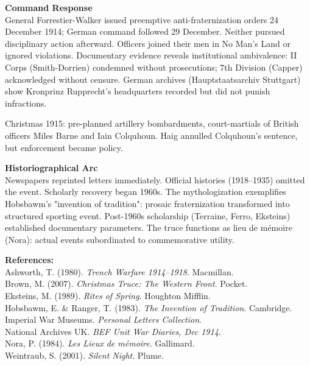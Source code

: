 \begin{technical}
\noindent\textbf{Command Response}\\[0.5em]
General Forrestier-Walker issued preemptive anti-fraternization orders 24 December 1914; German command followed 29 December. Neither pursued disciplinary action afterward. Officers joined their men in No Man's Land or ignored violations. Documentary evidence reveals institutional ambivalence: II Corps (Smith-Dorrien) condemned without prosecutions; 7th Division (Capper) acknowledged without censure. German archives (Hauptstaatsarchiv Stuttgart) show Kronprinz Rupprecht's headquarters recorded but did not punish infractions.

Christmas 1915: pre-planned artillery bombardments, court-martials of British officers Miles Barne and Iain Colquhoun. Haig annulled Colquhoun's sentence, but enforcement became policy. 

\noindent\textbf{Historiographical Arc}\\[0.5em]
Newspapers reprinted letters immediately. Official histories (1918–1935) omitted the event. Scholarly recovery began 1960s. The mythologization exemplifies Hobsbawm's "invention of tradition": prosaic fraternization transformed into structured sporting event. Post-1960s scholarship (Terraine, Ferro, Eksteins) established documentary parameters. The truce functions as lieu de mémoire (Nora): actual events subordinated to commemorative utility.

\vspace{0.5em}
\noindent\textbf{References:}\\
Ashworth, T. (1980). \textit{Trench Warfare 1914–1918}. Macmillan.\\
Brown, M. (2007). \textit{Christmas Truce: The Western Front}. Pocket.\\
Eksteins, M. (1989). \textit{Rites of Spring}. Houghton Mifflin.\\
Hobsbawm, E. & Ranger, T. (1983). \textit{The Invention of Tradition}. Cambridge.\\
Imperial War Museums. \textit{Personal Letters Collection}.\\
National Archives UK. \textit{BEF Unit War Diaries, Dec 1914}.\\
Nora, P. (1984). \textit{Les Lieux de mémoire}. Gallimard.\\
Weintraub, S. (2001). \textit{Silent Night}. Plume.
\end{technical}
